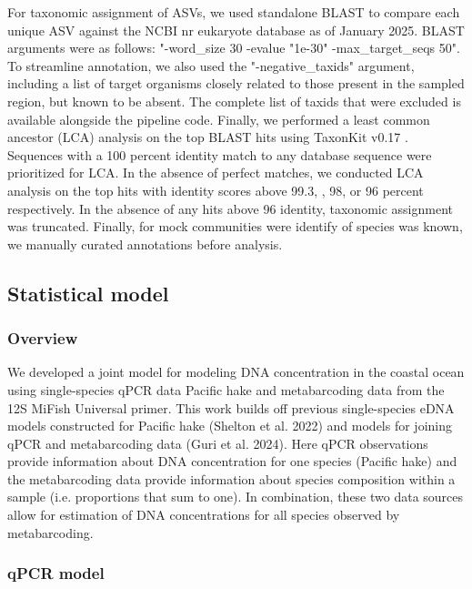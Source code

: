 \documentclass{article}
\begin{document}
For taxonomic assignment of ASVs, we used standalone BLAST \cite{altschul1990} to compare each unique ASV against the NCBI nr eukaryote database as of January 2025. BLAST arguments were as follows: "-word\_size 30 -evalue "1e-30" -max\_target\_seqs 50". To streamline annotation, we also used the "-negative\_taxids" argument, including a list of target organisms closely related to those present in the sampled region, but known to be absent. The complete list of taxids that were excluded is available alongside the pipeline code. Finally, we performed a least common ancestor (LCA) analysis on the top BLAST hits using TaxonKit v0.17 \cite{shen2021}. Sequences with a 100 percent identity match to any database sequence were prioritized for LCA. In the absence of perfect matches, we conducted LCA analysis on the top hits with identity scores above 99.3, , 98, or 96 percent respectively. In the absence of any hits above 96 identity, taxonomic assignment was truncated. Finally, for mock communities were identify of species was known, we manually curated annotations before analysis. 

\subsection*{Statistical model}

\subsubsection*{Overview}

We developed a joint model for modeling DNA concentration in the coastal ocean using single-species qPCR data Pacific hake and metabarcoding data from the 12S MiFish Universal primer. This work builds off previous single-species eDNA models constructed for Pacific hake (Shelton et al. 2022) and models for joining qPCR and metabarcoding data (Guri et al. 2024). Here qPCR observations provide information about DNA concentration for one species (Pacific hake) and the metabarcoding data provide information about species composition within a sample (i.e. proportions that sum to one).  In combination, these two data sources allow for estimation of DNA concentrations for all species observed by metabarcoding.

\subsubsection*{qPCR model}
\end{document}
